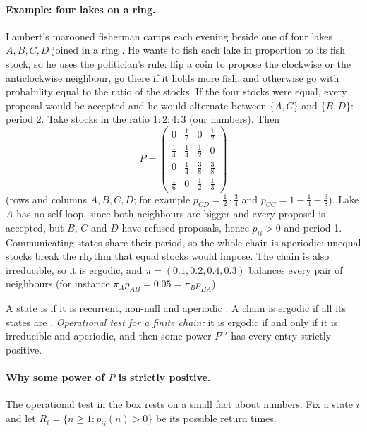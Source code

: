 \paragraph{Example: four lakes on a ring.}
Lambert's marooned fisherman camps each evening beside one of four lakes $A,B,C,D$ joined in a
ring . He wants to fish each lake in proportion to its fish stock, so he uses
the politician's rule: flip a coin to propose the clockwise or the anticlockwise neighbour, go
there if it holds more fish, and otherwise go with probability equal to the ratio of the stocks.
If the four stocks were equal, every proposal would be accepted and he would alternate between
$\{A,C\}$ and $\{B,D\}$: period 2. Take stocks in the ratio $1:2:4:3$ (our numbers). Then
\begin{equation*}
  P=\begin{pmatrix}
    0&\tfrac12&0&\tfrac12\\[1pt]
    \tfrac14&\tfrac14&\tfrac12&0\\[1pt]
    0&\tfrac14&\tfrac38&\tfrac38\\[1pt]
    \tfrac16&0&\tfrac12&\tfrac13
  \end{pmatrix}
\end{equation*}
(rows and columns $A,B,C,D$; for example $p_{CD}=\tfrac12\cdot\tfrac34$ and $p_{CC}=1-\tfrac14-\tfrac38$).
Lake $A$ has no self-loop, since both neighbours are bigger and every proposal is accepted, but
$B$, $C$ and $D$ have refused proposals, hence $p_{ii}>0$ and period 1. Communicating states
share their period, so the whole chain is aperiodic: unequal stocks break the rhythm that
equal stocks would impose. The chain is also irreducible, so it is ergodic, and
$\pi=(0.1,0.2,0.4,0.3)$ balances every pair of neighbours (for instance
$\pi_Ap_{AB}=0.05=\pi_Bp_{BA}$).

\begin{workdef}
A state is  if it is recurrent, non-null 
and aperiodic . A chain is ergodic if all
its states are .
\emph{Operational test for a finite chain:} it is ergodic if and only if it is irreducible and
aperiodic, and then some power $P^m$ has every entry strictly positive.
\end{workdef}

\paragraph{Why some power of $P$ is strictly positive.}
The operational test in the box rests on a small fact about numbers. Fix a state $i$ and let
$R_i=\{n\ge1:p_{ii}(n)>0\}$ be its possible return times.

